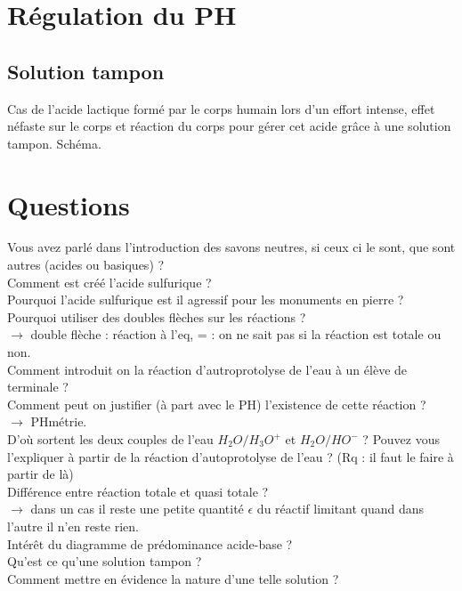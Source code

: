 \documentclass[12pt,prb,aps,epsf]{report}
\begin{document}
\section{Régulation du PH}
\subsection{Solution tampon}
Cas de l'acide lactique formé par le corps humain lors d'un effort intense, effet néfaste sur le corps et réaction du corps pour gérer cet acide grâce à une solution tampon. Schéma.

\section*{Questions}
Vous avez parlé dans l'introduction des savons neutres, si ceux ci le sont, que sont autres (acides ou basiques) ?\\

Comment est créé l'acide sulfurique ?\\

Pourquoi l'acide sulfurique est il agressif pour les monuments en pierre ?\\

Pourquoi utiliser des doubles flèches sur les réactions ? \\
$\rightarrow$ double flèche : réaction à l'eq, = : on ne sait pas si la réaction est totale ou non.\\

Comment introduit on la réaction d'autroprotolyse de l'eau à un élève de terminale ?\\
Comment peut on justifier (à part avec le PH) l'existence de cette réaction ?\\
$\rightarrow$ PHmétrie.\\

D'où sortent les deux couples de l'eau $H_2O/H_3O^+$ et $H_2O/HO^-$ ? Pouvez vous l'expliquer à partir de la réaction d'autoprotolyse de l'eau ? (Rq : il faut le faire à partir de là)\\

Différence entre réaction totale et quasi totale ?\\
$\rightarrow$ dans un cas il reste une petite quantité $\epsilon$ du réactif limitant quand dans l'autre il n'en reste rien.\\

Intérêt du diagramme de prédominance acide-base ?\\

Qu'est ce qu'une solution tampon ?\\
Comment mettre en évidence la nature d'une telle solution ?\\
\end{document}

